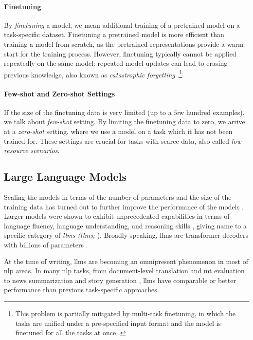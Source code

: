 {\paragraph{Finetuning} By \emph{finetuning} a model, we mean additional training of a pretrained model on a task-specific dataset. Finetuning a pretrained model is more efficient than training a model from scratch, as the pretrained representations provide a warm start for the training process. However, finetuning typically cannot be applied repeatedly on the same model: repeated model updates can lead to erasing previous knowledge, also known as \emph{catastrophic forgetting} \cite{mccloskey1989catastrophic,kirkpatrick2017overcoming}.\footnote{This problem is partially mitigated by multi-task finetuning, in which the tasks are unified under a pre-specified input format and the model is finetuned for all the tasks at once \cite{sanh2021multitask,xieUnifiedSKGUnifyingMultiTasking2022}.}


\paragraph{Few-shot and Zero-shot Settings} If the size of the finetuning data is very limited (up to a few hundred examples), we talk about \emph{few-shot} setting. By limiting the finetuning data to zero, we arrive at a \emph{zero-shot} setting, where we use a model on a task which it has not been trained for. These settings are crucial for tasks with scarce data, also called \emph{low-resource scenarios}. \cite{hedderich2021survey}


\subsection{Large Language Models}
\label{sec:llms}
Scaling the models in terms of the number of parameters and the size of the training data has turned out to further improve the performance of the models \cite{kaplan2020scaling,hoffmann2022training}. Larger models were shown to exhibit unprecedented capabilities in terms of language fluency, language understanding, and reasoning skills \cite{wei2022emergent,bubeck2023sparks}, giving name to a specific category of \emph{\aclp{llm} (\acsp{llm};} \citealp{brown2020language,zhao2023survey}). Broadly speaking, \acp{llm} are transformer decoders with billions of parameters \cite{yang2024harnessing}.

At the time of writing, \acp{llm} are becoming an omnipresent phenomenon in most of \ac{nlp} areas. In many \ac{nlp} tasks, from document-level translation \cite{wang2023documentlevel} and \ac{mt} evaluation \cite{kocmiLargeLanguageModels2023} to news summarization \cite{zhang2024benchmarking} and story generation \cite{xie2023next}, \acp{llm} have comparable or better performance than previous task-specific approaches.

}
